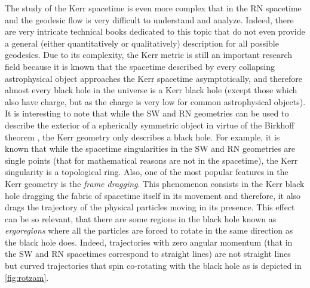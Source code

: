 The study of the Kerr spacetime is even more complex that in the \gls{RN} spacetime and the geodesic flow is very difficult to understand and analyze. Indeed, there are very intricate technical books dedicated to this topic \cite{o1995geometry} that do not even provide a general (either quantitatively or qualitatively) description for all possible geodesics. Due to its complexity, the Kerr metric is still an important research field because it is known that the spacetime described by every collapsing astrophysical object approaches the Kerr spacetime asymptotically, and therefore almost every black hole in the universe is a Kerr black hole (except those which also have charge, but as the charge is very low for common astrophysical objects). It is interesting to note that while the \gls{SW} and \gls{RN} geometries can be used to describe the exterior of a spherically symmetric object in virtue of the Birkhoff theorem \cite{birkhoff1923relativity}, the Kerr geometry only describes a black hole. For example, it is known that while the spacetime singularities in the \gls{SW} and \gls{RN} geometries are single points (that for mathematical reasons are not in the spacetime), the Kerr singularity is a topological ring. Also, one of the most popular features in the Kerr geometry is the \textit{frame dragging}. This phenomenon consists in the Kerr black hole dragging the fabric of spacetime itself in its movement and therefore, it also drags the trajectory of the physical particles moving in its presence. This effect can be so relevant, that there are some regions in the black hole known as \textit{ergoregions} where all the particles are forced to rotate in the same direction as the black hole does. Indeed, trajectories with zero angular momentum (that in the \gls{SW} and \gls{RN} spacetimes correspond to straight lines) are not straight lines but curved trajectories that spin co-rotating with the black hole as is depicted in \cref{fig:rotzam}.
